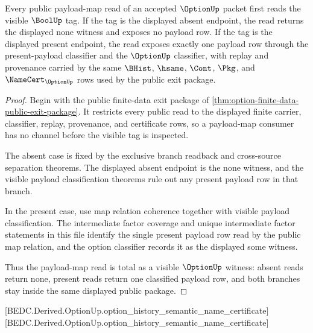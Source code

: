 \begin{theorem}
\label{thm:option-payload-map-totality}
Every public payload-map read of an accepted $\OptionUp$ packet first reads the
visible $\BoolUp$ tag. If the tag is the displayed absent endpoint, the read
returns the displayed none witness and exposes no payload row. If the tag is
the displayed present endpoint, the read exposes exactly one payload row through
the present-payload classifier and the $\OptionUp$ classifier, with replay and
provenance carried by the same $\BHist$, $\hsame$, $\Cont$, $\Pkg$, and
$\NameCert_{\OptionUp}$ rows used by the public exit package.
\end{theorem}
\begin{proof}
Begin with the public finite-data exit package of
\autoref{thm:option-finite-data-public-exit-package}. It restricts every public
read to the displayed finite carrier, classifier, replay, provenance, and
certificate rows, so a payload-map consumer has no channel before the visible
tag is inspected.

The absent case is fixed by the exclusive branch readback and cross-source
separation theorems. The displayed absent endpoint is the none witness, and the
visible payload classification theorems rule out any present payload row in
that branch.

In the present case, use map relation coherence together with visible payload
classification. The intermediate factor coverage and unique intermediate
factor statements in this file identify the single present payload row read by
the public map relation, and the option classifier records it as the displayed
some witness.

Thus the payload-map read is total as a visible $\OptionUp$ witness: absent
reads return none, present reads return one classified payload row, and both
branches stay inside the same displayed public package.
\end{proof}

[BEDC.Derived.OptionUp.option\_history\_semantic\_name\_certificate]
[BEDC.Derived.OptionUp.option\_history\_semantic\_name\_certificate]

